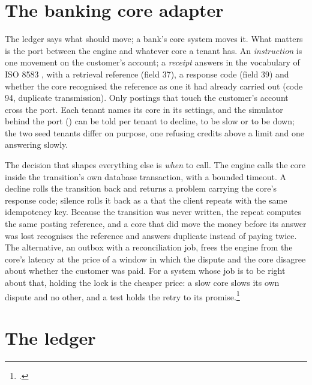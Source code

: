 \section{The banking core adapter}
\label{sec:design-core}

The ledger says what should move; a bank's core system moves it. What matters is the port between the engine and
whatever core a tenant has. An \emph{instruction} is one movement on the customer's account;
a \emph{receipt} answers in the vocabulary of ISO 8583 \cite{iso8583}, with a retrieval reference (field 37), a response code
(field 39) and whether the core recognised the reference as one it had already carried out (code 94, duplicate
transmission). Only postings that touch the customer's account cross the port. Each tenant names its core in its
settings, and the simulator behind the port () can be told per tenant to decline, to
be slow or to be down; the two seed tenants differ on purpose, one refusing credits above a limit and one
answering slowly.

The decision that shapes everything else is \emph{when} to call. The engine calls the core inside the
transition's own database transaction, with a bounded timeout. A decline rolls the transition back and returns a
 problem carrying the core's response code; silence rolls it back as a  that the client repeats
with the same idempotency key. Because the transition was never written, the repeat computes the same posting
reference, and a core that did move the money before its answer was lost recognises the reference and answers
duplicate instead of paying twice. The alternative, an outbox with a reconciliation job, frees the engine from the
core's latency at the price of a window in which the dispute and the core disagree about whether the customer was
paid. For a system whose job is to be right about that, holding the lock is the cheaper price: a slow core slows
its own dispute and no other, and a test holds the retry to its promise.\footnote{.}

\section{The ledger}
\label{sec:design-ledger}

